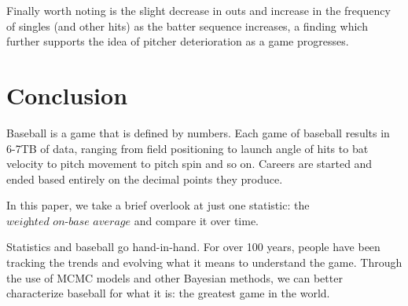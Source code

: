 \documentclass[a4paper,12pt]{article}
\begin{document}
Finally worth noting is the slight decrease in outs and increase in the frequency of singles (and other hits) as the batter sequence increases, a finding which further supports the idea of pitcher deterioration as a game progresses.

\section{Conclusion}

Baseball is a game that is defined by numbers. Each game of baseball results in 6-7TB of data, ranging from field positioning to launch angle of hits to bat velocity to pitch movement to pitch spin and so on. Careers are started and ended based entirely on the decimal points they produce. 

In this paper, we take a brief overlook at just one statistic: the $\textit{weighted on-base average}$ and compare it over time. 

Statistics and baseball go hand-in-hand. For over 100 years, people have been tracking the trends and evolving what it means to understand the game. Through the use of MCMC models and other Bayesian methods, we can better characterize baseball for what it is: the greatest game in the world.
\newpage


\end{document}

